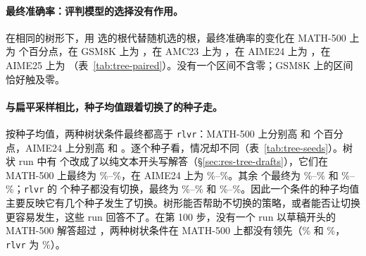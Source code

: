 \begin{table}[t]
\centering\small\setlength{\tabcolsep}{5pt}

\caption{训练期间树的内部情况（对步数和种子取平均）：在 128 个词元内已经结束的根的比例；在审计步上（每十步一次，一个提示的四个根都被续写），\kev{} 对根的 \emph{on track} 分数对其叶子验证结果的 AUROC（合并与提示内部）、全部四个根的叶子准确率（\%），以及保留所选的两个根或事后最好的两个根相对于它的收益（百分点）；每步生成的词元数（千，最后 20 步），不含审计的续写。}
\label{tab:tree-stats}
\end{table}

\paragraph{最终准确率：评判模型的选择没有作用。} 在相同的树形下，用 \kev{} 选的根代替随机选的根，最终准确率的变化在 MATH-500 上为   个百分点，在 GSM8K 上为  ，在 AMC23 上为  ，在 AIME24 上为  ，在 AIME25 上为  （表~\ref{tab:tree-paired}）。没有一个区间不含零；GSM8K 上的区间恰好触及零。

\paragraph{与扁平采样相比，种子均值跟着切换了的种子走。} 按种子均值，两种树状条件最终都高于 \texttt{rlvr}：MATH-500 上分别高  和  个百分点，AIME24 上分别高  和 。逐个种子看，情况却不同（表~\ref{tab:tree-seeds}）。树状 run 中有  个改成了以纯文本开头写解答（\S\ref{sec:res-tree-drafts}），它们在 MATH-500 上最终为 \%--\%，在 AIME24 上为 \%--\%。其余  个最终为 \%--\% 和 \%--\%；\texttt{rlvr} 的  个种子都没有切换，最终为 \%--\% 和 \%--\%。因此一个条件的种子均值主要反映它有几个种子发生了切换。树形能否帮助不切换的策略，或者能否让切换更容易发生，这些 run 回答不了。在第 100 步，没有一个 run 以草稿开头的 MATH-500 解答超过 ，两种树状条件在 MATH-500 上都没有领先（\% 和 \%，\texttt{rlvr} 为 \%）。

